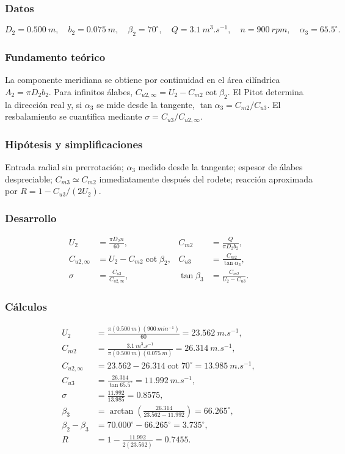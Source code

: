 \documentclass[12pt]{article}
\begin{document}
\subsubsection*{Datos}
\[
D_2=\SI{0.500}{m},\quad b_2=\SI{0.075}{m},\quad
\beta_2=70^\circ,\quad Q=\SI{3.1}{m^3.s^{-1}},\quad
n=\SI{900}{rpm},\quad\alpha_3=65.5^\circ.
\]

\subsubsection*{Fundamento teórico}
La componente meridiana se obtiene por continuidad en el área cilíndrica
$A_2=\pi D_2b_2$. Para infinitos álabes,
$C_{u2,\infty}=U_2-C_{m2}\cot\beta_2$. El Pitot determina la dirección real y, si
$\alpha_3$ se mide desde la tangente, $\tan\alpha_3=C_{m2}/C_{u3}$. El resbalamiento se
cuantifica mediante $\sigma=C_{u3}/C_{u2,\infty}$.

\subsubsection*{Hipótesis y simplificaciones}
Entrada radial sin prerrotación; $\alpha_3$ medido desde la tangente; espesor de álabes
despreciable; $C_{m3}\simeq C_{m2}$ inmediatamente después del rodete; reacción aproximada
por $R=1-C_{u3}/(2U_2)$.

\subsubsection*{Desarrollo}
\begin{align*}
U_2&=\frac{\pi D_2n}{60},&
C_{m2}&=\frac{Q}{\pi D_2b_2},\\
C_{u2,\infty}&=U_2-C_{m2}\cot\beta_2,&
C_{u3}&=\frac{C_{m2}}{\tan\alpha_3},\\
\sigma&=\frac{C_{u3}}{C_{u2,\infty}},&
\tan\beta_3&=\frac{C_{m2}}{U_2-C_{u3}}.
\end{align*}

\subsubsection*{Cálculos}
\begin{align*}
U_2&=\frac{\pi(\SI{0.500}{m})(\SI{900}{min^{-1}})}{60}
=\SI{23.562}{m.s^{-1}},\\
C_{m2}&=\frac{\SI{3.1}{m^3.s^{-1}}}
{\pi(\SI{0.500}{m})(\SI{0.075}{m})}
=\SI{26.314}{m.s^{-1}},\\
C_{u2,\infty}&=23.562-26.314\cot70^\circ
=\SI{13.985}{m.s^{-1}},\\
C_{u3}&=\frac{26.314}{\tan65.5^\circ}
=\SI{11.992}{m.s^{-1}},\\
\sigma&=\frac{11.992}{13.985}=0.8575,\\
\beta_3&=\arctan\left(\frac{26.314}{23.562-11.992}\right)
=66.265^\circ,\\
\beta_2-\beta_3&=70.000^\circ-66.265^\circ=3.735^\circ,\\
R&=1-\frac{11.992}{2(23.562)}=0.7455.
\end{align*}
\end{document}
